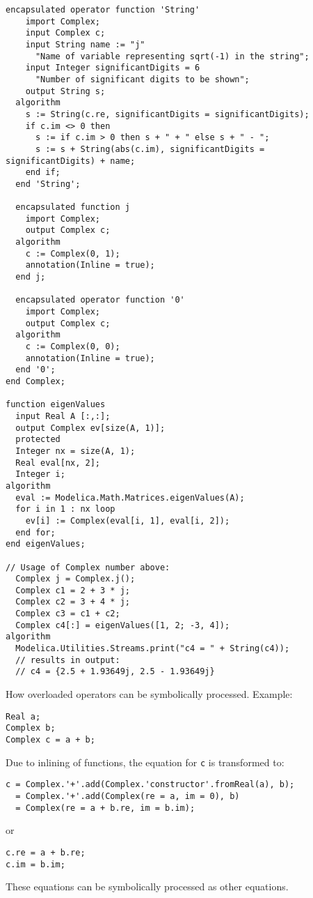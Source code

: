 \begin{example}
\begin{lstlisting}[language=modelica,escapechar=!]
  encapsulated operator function 'String'
    import Complex;
    input Complex c;
    input String name := "j"
      "Name of variable representing sqrt(-1) in the string";
    input Integer significantDigits = 6
      "Number of significant digits to be shown";
    output String s;
  algorithm
    s := String(c.re, significantDigits = significantDigits);
    if c.im <> 0 then
      s := if c.im > 0 then s + " + " else s + " - ";
      s := s + String(abs(c.im), significantDigits = significantDigits) + name;
    end if;
  end 'String';

  encapsulated function j
    import Complex;
    output Complex c;
  algorithm
    c := Complex(0, 1);
    annotation(Inline = true);
  end j;

  encapsulated operator function '0'
    import Complex;
    output Complex c;
  algorithm
    c := Complex(0, 0);
    annotation(Inline = true);
  end '0';
end Complex;

function eigenValues
  input Real A [:,:];
  output Complex ev[size(A, 1)];
  protected
  Integer nx = size(A, 1);
  Real eval[nx, 2];
  Integer i;
algorithm
  eval := Modelica.Math.Matrices.eigenValues(A);
  for i in 1 : nx loop
    ev[i] := Complex(eval[i, 1], eval[i, 2]);
  end for;
end eigenValues;

// Usage of Complex number above:
  Complex j = Complex.j();
  Complex c1 = 2 + 3 * j;
  Complex c2 = 3 + 4 * j;
  Complex c3 = c1 + c2;
  Complex c4[:] = eigenValues([1, 2; -3, 4]);
algorithm
  Modelica.Utilities.Streams.print("c4 = " + String(c4));
  // results in output:
  // c4 = {2.5 + 1.93649j, 2.5 - 1.93649j}
\end{lstlisting}

How overloaded operators can be symbolically processed.
Example:
\begin{lstlisting}[language=modelica]
Real a;
Complex b;
Complex c = a + b;
\end{lstlisting}
Due to inlining of functions, the equation for \lstinline!c! is transformed to:
\begin{lstlisting}[language=modelica]
c = Complex.'+'.add(Complex.'constructor'.fromReal(a), b);
  = Complex.'+'.add(Complex(re = a, im = 0), b)
  = Complex(re = a + b.re, im = b.im);
\end{lstlisting}
or
\begin{lstlisting}[language=modelica]
c.re = a + b.re;
c.im = b.im;
\end{lstlisting}
These equations can be symbolically processed as other equations.


\end{example}
